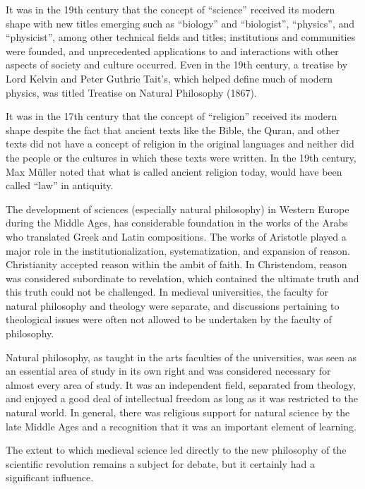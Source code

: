 It was in the 19th century that the concept of ``science'' received its modern shape with new titles emerging such as ``biology'' and ``biologist'', ``physics'', and ``physicist'', among other technical fields and titles; institutions and communities were founded, and unprecedented applications to and interactions with other aspects of society and culture occurred. Even in the 19th century, a treatise by Lord Kelvin and Peter Guthrie Tait's, which helped define much of modern physics, was titled Treatise on Natural Philosophy (1867).

It was in the 17th century that the concept of ``religion'' received its modern shape despite the fact that ancient texts like the Bible, the Quran, and other texts did not have a concept of religion in the original languages and neither did the people or the cultures in which these texts were written. In the 19th century, Max Müller noted that what is called ancient religion today, would have been called ``law'' in antiquity.

The development of sciences (especially natural philosophy) in Western Europe during the Middle Ages, has considerable foundation in the works of the Arabs who translated Greek and Latin compositions. The works of Aristotle played a major role in the institutionalization, systematization, and expansion of reason. Christianity accepted reason within the ambit of faith. In Christendom, reason was considered subordinate to revelation, which contained the ultimate truth and this truth could not be challenged. In medieval universities, the faculty for natural philosophy and theology were separate, and discussions pertaining to theological issues were often not allowed to be undertaken by the faculty of philosophy.

Natural philosophy, as taught in the arts faculties of the universities, was seen as an essential area of study in its own right and was considered necessary for almost every area of study. It was an independent field, separated from theology, and enjoyed a good deal of intellectual freedom as long as it was restricted to the natural world. In general, there was religious support for natural science by the late Middle Ages and a recognition that it was an important element of learning.

The extent to which medieval science led directly to the new philosophy of the scientific revolution remains a subject for debate, but it certainly had a significant influence.

